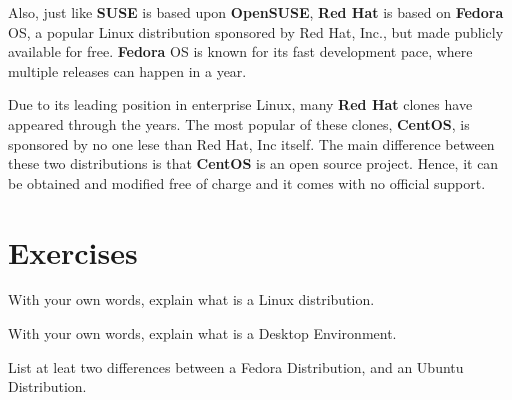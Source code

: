 Also, just like \textbf{SUSE} is based upon \textbf{OpenSUSE}, \textbf{Red Hat} is based on \textbf{Fedora} \acs{OS}, a popular Linux distribution sponsored by Red Hat, Inc., but made publicly available for free. \textbf{Fedora} \acs{OS} is known for its fast development pace, where multiple releases can happen in a year.

Due to its leading position in enterprise Linux, many \textbf{Red Hat} clones have appeared through the years. The most popular of these clones, \textbf{CentOS}, is sponsored by no one lese than Red Hat, Inc itself. The main difference between these two distributions is that \textbf{CentOS} is an open source project. Hence, it can be obtained and modified free of charge and it comes with no official support.

\section*{Exercises}


\begin{exercises}
\item With your own words, explain what is a Linux distribution.
\item With your own words, explain what is a Desktop Environment.
\item List at leat two differences between a Fedora Distribution, and an Ubuntu Distribution.
\end{exercises}
